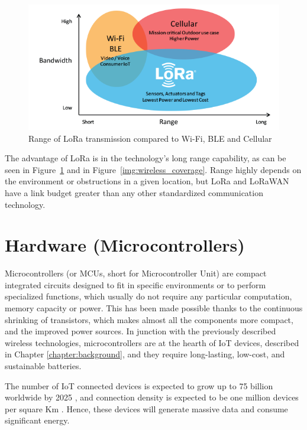 			\begin{figure}[h]
				\centering
				\includegraphics[width=\textwidth]{resources/img/chap3/LoRa_Why_Range}
				\caption{Range of LoRa transmission compared to Wi-Fi, BLE and Cellular}
				\label{img:lora_range}
			\end{figure}
			
			The advantage of LoRa is in the technology's long range capability, as can be seen in Figure~\ref{img:lora_range} and in Figure~\ref{img:wireless_coverage}.
			Range highly depends on the environment or obstructions in a given location, but LoRa and LoRaWAN have a link budget greater than any other standardized communication technology.
					
	\section{Hardware (Microcontrollers)}\label{sec:microcontrollers}
	
	
		Microcontrollers (or MCUs, short for Microcontroller Unit) are compact integrated circuits designed to fit in specific environments or to perform specialized functions, which usually do not require any particular computation, memory capacity or power.
		This has been made possible thanks to the continuous shrinking of transistors, which makes almost all the components more compact, and the improved power sources.
		In junction with the previously described wireless technologies, microcontrollers are at the hearth of IoT devices, described in Chapter \ref{chapter:background}, and they require long-lasting, low-cost, and sustainable batteries.
		
		The number of IoT connected devices is expected to grow up to 75 billion worldwide by 2025 \cite{statista}, and connection density is expected to be one million devices per square Km \cite{noma}.
		Hence, these devices will generate massive data and consume significant energy.
		
